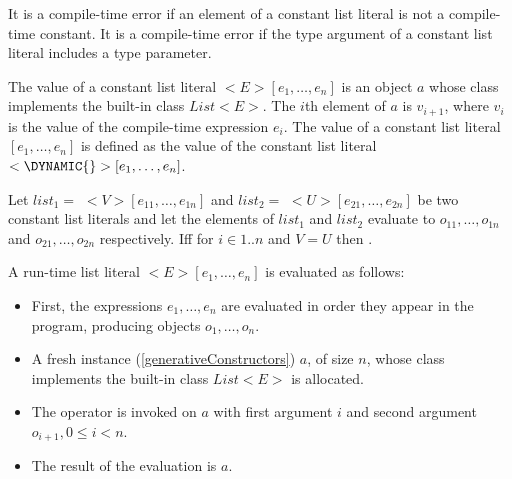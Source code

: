 \documentclass{article}
\begin{document}
\LMHash{}
It is a compile-time error if an element of a constant list literal is not a compile-time constant.
It is a compile-time error if the type argument of a constant list literal includes a type parameter.

\LMHash{}
The value of a constant list literal \CONST{} $<E>[e_1, \ldots, e_n]$ is an object $a$ whose class implements the built-in class $List<E>$.
The $i$th element of $a$ is $v_{i+1}$, where $v_i$ is the value of the compile-time expression $e_i$.
The value of a constant list literal \CONST{} $[e_1, \ldots, e_n]$ is defined as the value of the constant list literal \CONST{}$ <\DYNAMIC{}>[e_1, \ldots, e_n]$.

\LMHash{}
Let $list_1 =$ \CONST{} $<V>[e_{11}, \ldots, e_{1n}]$ and $list_2 =$ \CONST{} $<U>[e_{21}, \ldots, e_{2n}]$ be two constant list literals and let the elements of $list_1$ and $list_2$ evaluate to $o_{11}, \ldots, o_{1n}$ and $o_{21}, \ldots, o_{2n}$ respectively.
If{}f  for $i \in 1 .. n$ and $V = U$ then .


\LMHash{}
A run-time list literal $<E>[e_1, \ldots, e_n]$ is evaluated as follows:
\begin{itemize}
\item
First, the expressions $e_1, \ldots, e_n$ are evaluated in order they appear in the program, producing objects $o_1, \ldots, o_n$.
\item A fresh instance (\ref{generativeConstructors}) $a$, of size $n$, whose class implements the built-in class $List<E>$ is allocated.
\item
The operator \code{[]=} is invoked on $a$ with first argument $i$ and second argument
$o_{i+1}, 0 \le i < n$.
\item
The result of the evaluation is $a$.
\end{itemize}

\end{document}

